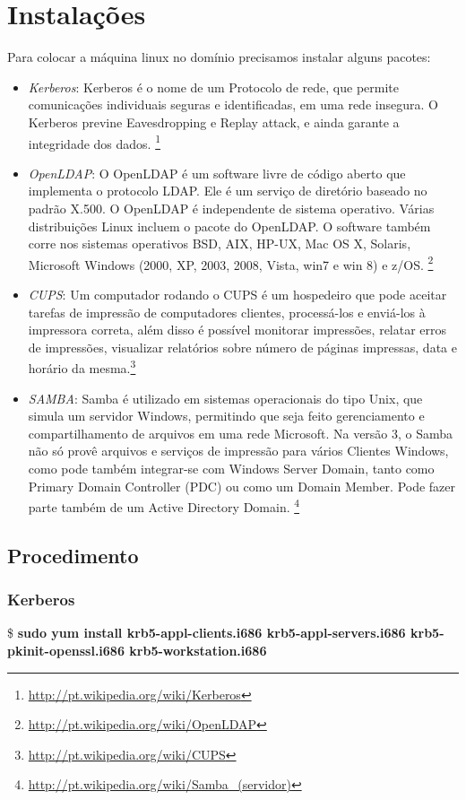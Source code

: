 \documentclass[a4paper,10pt]{article}
\begin{document}
\section{Instalações}
Para colocar a máquina linux no domínio precisamos instalar alguns pacotes:
\begin{itemize}
\item \label{itm:kerberos} \emph{Kerberos}: Kerberos é o nome de um Protocolo de rede, que permite comunicações individuais seguras e identificadas, em uma rede insegura. 
O Kerberos previne Eavesdropping e Replay attack, e ainda garante a integridade dos dados. \footnote{\url{http://pt.wikipedia.org/wiki/Kerberos}}
\item \label{itm:openldap} \emph{OpenLDAP}: O OpenLDAP é um software livre de código aberto que implementa o protocolo LDAP. Ele é um serviço de diretório baseado no padrão X.500.
O OpenLDAP é independente de sistema operativo. Várias distribuições Linux incluem o pacote do OpenLDAP. O software também corre nos sistemas operativos BSD, AIX, HP-UX, Mac OS X, Solaris, Microsoft Windows (2000, XP, 2003, 2008, Vista, win7 e win 8) e z/OS. \footnote{\url{http://pt.wikipedia.org/wiki/OpenLDAP}}
\item \label{itm:cups} \emph{CUPS}: Um computador rodando o CUPS é um hospedeiro que pode aceitar tarefas de impressão de computadores clientes, processá-los e enviá-los à impressora correta, além disso é possível monitorar impressões, relatar erros de impressões, visualizar relatórios sobre número de páginas impressas, data e horário da mesma.\footnote{\url{http://pt.wikipedia.org/wiki/CUPS}}
\item \label{itm:samba} \emph{SAMBA}: Samba é  utilizado em sistemas operacionais do tipo Unix, que simula um servidor Windows, permitindo que seja feito gerenciamento e compartilhamento de arquivos em uma rede Microsoft. Na versão 3, o Samba não só provê arquivos e serviços de impressão para vários Clientes Windows, como pode também integrar-se com Windows Server Domain, tanto como Primary Domain Controller (PDC) ou como um Domain Member. Pode fazer parte também de um Active Directory Domain. \footnote{\url{http://pt.wikipedia.org/wiki/Samba_(servidor)}}
\end{itemize}

\subsection{Procedimento}
\subsubsection{Kerberos}
\$  \textbf{sudo yum install krb5-appl-clients.i686 krb5-appl-servers.i686 krb5-pkinit-openssl.i686 krb5-workstation.i686}
\end{document}
